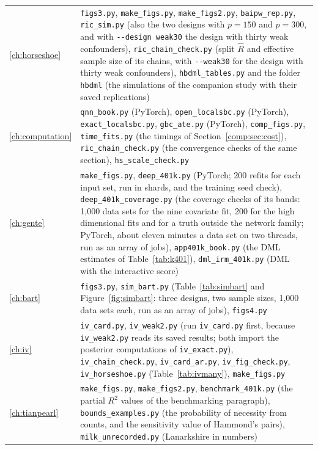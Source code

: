 {\begin{longtable}{@{}L{0.75in}L{3.5in}@{}}
\ref{ch:horseshoe} & \texttt{figs3.py}, \texttt{make\_figs.py}, \texttt{make\_figs2.py}, \texttt{baipw\_rep.py}, \texttt{ric\_sim.py} (also the two designs with $p = 150$ and $p = 300$, and with \texttt{-{}-design weak30} the design with thirty weak confounders), \texttt{ric\_chain\_check.py} (split $\hat R$ and effective sample size of its chains, with \texttt{-{}-weak30} for the design with thirty weak confounders), \texttt{hbdml\_tables.py} and the folder \texttt{hbdml} (the simulations of the companion study with their saved replications) \\
\ref{ch:computation} & \texttt{qnn\_book.py} (PyTorch), \texttt{open\_localsbc.py} (PyTorch), \texttt{exact\_localsbc.py}, \texttt{gbc\_ate.py} (PyTorch), \texttt{comp\_figs.py}, \texttt{time\_fits.py} (the timings of Section~\ref{comp:sec:cost}), \texttt{ric\_chain\_check.py} (the convergence checks of the same section), \texttt{hs\_scale\_check.py} \\
\ref{ch:gente} & \texttt{make\_figs.py}, \texttt{deep\_401k.py} (PyTorch; 200 refits for each input set, run in shards, and the training seed check), \texttt{deep\_401k\_coverage.py} (the coverage checks of its bands: 1,000 data sets for the nine covariate fit, 200 for the high dimensional fits and for a truth outside the network family; PyTorch, about eleven minutes a data set on two threads, run as an array of jobs), \texttt{app401k\_book.py} (the DML estimates of Table~\ref{tab:k401}), \texttt{dml\_irm\_401k.py} (DML with the interactive score) \\
\ref{ch:bart} & \texttt{figs3.py}, \texttt{sim\_bart.py} (Table~\ref{tab:simbart} and Figure~\ref{fig:simbart}: three designs, two sample sizes, 1,000 data sets each, run as an array of jobs), \texttt{figs4.py} \\
\ref{ch:iv} & \texttt{iv\_card.py}, \texttt{iv\_weak2.py} (run \texttt{iv\_card.py} first, because \texttt{iv\_weak2.py} reads its saved results; both import the posterior computations of \texttt{iv\_exact.py}), \texttt{iv\_chain\_check.py}, \texttt{iv\_card\_ar.py}, \texttt{iv\_fig\_check.py}, \texttt{iv\_horseshoe.py} (Table~\ref{tab:ivmany}), \texttt{make\_figs.py} \\
\ref{ch:tianpearl} & \texttt{make\_figs.py}, \texttt{make\_figs2.py}, \texttt{benchmark\_401k.py} (the partial $R^2$ values of the benchmarking paragraph), \texttt{bounds\_examples.py} (the probability of necessity from counts, and the sensitivity value of Hammond's pairs), \texttt{milk\_unrecorded.py} (Lanarkshire in numbers) \\

\end{longtable}}

